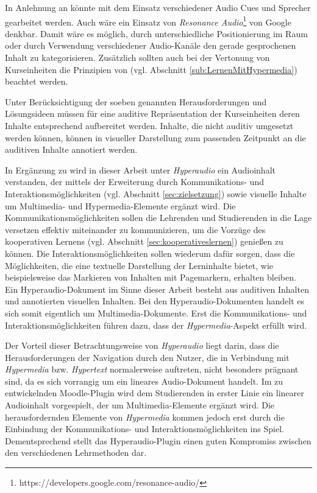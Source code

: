In Anlehnung an \cite{donker2007gestaltung} könnte mit dem Einsatz verschiedener Audio Cues und Sprecher gearbeitet werden. Auch wäre ein Einsatz von \textit{Resonance Audio}\footnote{https://developers.google.com/resonance-audio/} von Google denkbar. Damit wäre es möglich, durch unterschiedliche Positionierung im Raum oder durch Verwendung verschiedener Audio-Kanäle den gerade gesprochenen Inhalt zu kategorisieren. Zusätzlich sollten auch bei der Vertonung von Kurseinheiten die Prinzipien von \cite{mayer2009multimedia} (vgl. Abschnitt \ref{sub:LernenMitHypermedia}) beachtet werden.

Unter Berücksichtigung der soeben genannten Herausforderungen und Lösungsideen müssen für eine auditive Repräsentation der Kurseinheiten deren Inhalte entsprechend aufbereitet werden. Inhalte, die nicht auditiv umgesetzt werden können, können in visueller Darstellung zum passenden Zeitpunkt an die auditiven Inhalte annotiert werden.

In Ergänzung zu \cite{zumbach2006learning} wird in dieser Arbeit unter \textit{Hyperaudio} ein Audioinhalt verstanden, der mittels der Erweiterung durch Kommunikations- und Interaktionsmöglichkeiten (vgl. Abschnitt \ref{sec:zielsetzung}) sowie visuelle Inhalte um Multimedia- und Hypermedia-Elemente ergänzt wird. Die Kommunikationsmöglichkeiten sollen die Lehrenden und Studierenden in die Lage versetzen effektiv miteinander zu kommunizieren, um die Vorzüge des kooperativen Lernens (vgl. Abschnitt \ref{sec:kooperativeslernen}) genießen zu können. Die Interaktionsmöglichkeiten sollen wiederum dafür sorgen, dass die Möglichkeiten, die eine textuelle Darstellung der Lerninhalte bietet, wie beispielsweise das Markieren von Inhalten mit Pagemarkern, erhalten bleiben.\\
Ein Hyperaudio-Dokument im Sinne dieser Arbeit besteht aus auditiven Inhalten und annotierten visuellen Inhalten. Bei den Hyperaudio-Dokumenten handelt es sich somit eigentlich um Multimedia-Dokumente. Erst die Kommunikations- und Interaktionsmöglichkeiten führen dazu, dass der \textit{Hypermedia}-Aspekt erfüllt wird.

Der Vorteil dieser Betrachtungsweise von \textit{Hyperaudio} liegt darin, dass die Herausforderungen der Navigation durch den Nutzer, die in Verbindung mit \textit{Hypermedia} bzw. \textit{Hypertext} normalerweise auftreten, nicht besonders prägnant sind, da es sich vorrangig um ein lineares Audio-Dokument handelt. Im zu entwickelnden Moodle-Plugin wird dem Studierenden in erster Linie ein linearer Audioinhalt vorgespielt, der um Multimedia-Elemente ergänzt wird. Die herausfordernden Elemente von \textit{Hypermedia} kommen jedoch erst durch die Einbindung der Kommunikations- und Interaktionsmöglichkeiten ins Spiel. Dementsprechend stellt das Hyperaudio-Plugin einen guten Kompromiss zwischen den verschiedenen Lehrmethoden dar.

